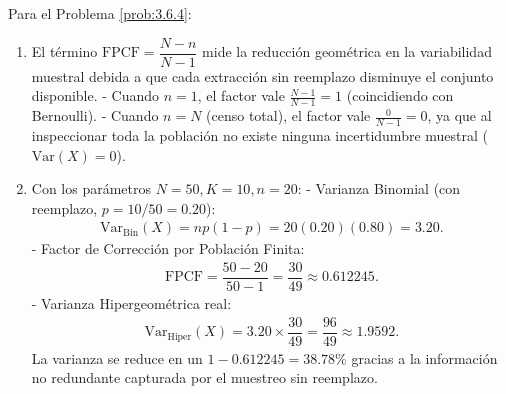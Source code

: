 \begin{solucion}
	\label{sol:3.6.4}
	Para el Problema \ref{prob:3.6.4}:
	\begin{enumerate}
		\item El término $\text{FPCF} = \dfrac{N-n}{N-1}$ mide la reducción geométrica en la variabilidad muestral debida a que cada extracción sin reemplazo disminuye el conjunto disponible. 
		- Cuando $n=1$, el factor vale $\frac{N-1}{N-1} = 1$ (coincidiendo con Bernoulli).
		- Cuando $n=N$ (censo total), el factor vale $\frac{0}{N-1} = 0$, ya que al inspeccionar toda la población no existe ninguna incertidumbre muestral ($\text{Var}(X) = 0$).
		\item Con los parámetros $N=50, K=10, n=20$:
		- Varianza Binomial (con reemplazo, $p = 10/50 = 0.20$):
		  \begin{align*}
		  	\text{Var}_{\text{Bin}}(X) = np(1-p) = 20(0.20)(0.80) = 3.20.
		  \end{align*}
		- Factor de Corrección por Población Finita:
		  \begin{align*}
		  	\text{FPCF} = \dfrac{50-20}{50-1} = \dfrac{30}{49} \approx 0.612245.
		  \end{align*}
		- Varianza Hipergeométrica real:
		  \begin{align*}
		  	\text{Var}_{\text{Hiper}}(X) = 3.20 \times \dfrac{30}{49} = \dfrac{96}{49} \approx 1.9592.
		  \end{align*}
		La varianza se reduce en un $1 - 0.612245 = 38.78\%$ gracias a la información no redundante capturada por el muestreo sin reemplazo.
	\end{enumerate}
\end{solucion}


